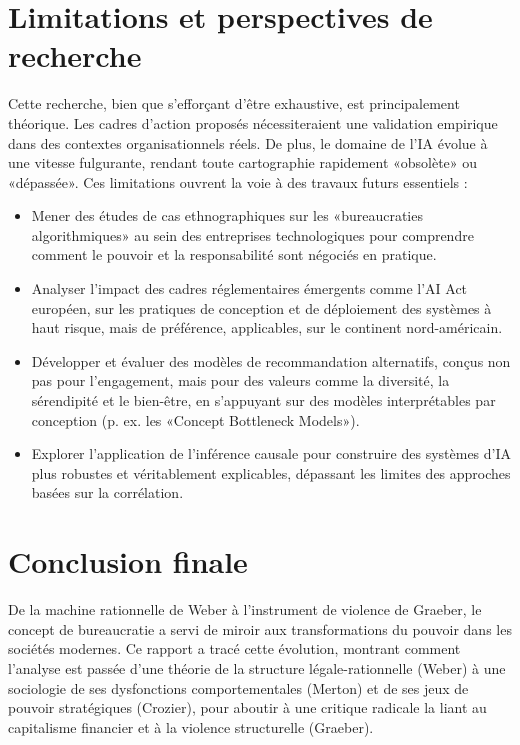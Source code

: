 \section{Limitations et perspectives de recherche}
Cette recherche, bien que s'efforçant d'être exhaustive, est principalement théorique. Les cadres d'action proposés nécessiteraient une validation empirique dans des contextes organisationnels réels. De plus, le domaine de l'IA évolue à une vitesse fulgurante, rendant toute cartographie rapidement «obsolète» ou «dépassée».
Ces limitations ouvrent la voie à des travaux futurs essentiels :
\begin{itemize}[label=\textbullet]
    \item Mener des études de cas ethnographiques sur les «bureaucraties algorithmiques» au sein des entreprises technologiques pour comprendre comment le pouvoir et la responsabilité sont négociés en pratique.
    \item Analyser l'impact des cadres réglementaires émergents comme l'AI Act européen, sur les pratiques de conception et de déploiement des systèmes à haut risque, mais de préférence, applicables, sur le continent nord-américain.
    \item Développer et évaluer des modèles de recommandation alternatifs, conçus non pas pour l'engagement, mais pour des valeurs comme la diversité, la sérendipité et le bien-être, en s'appuyant sur des modèles interprétables par conception (p. ex. les «Concept Bottleneck Models»).
    \item Explorer l'application de l'inférence causale pour construire des systèmes d'IA plus robustes et véritablement explicables, dépassant les limites des approches basées sur la corrélation.
\end{itemize}

\section{Conclusion finale}

De la machine rationnelle de Weber à l'instrument de violence de Graeber, le concept de bureaucratie a servi de miroir aux transformations du pouvoir dans les sociétés modernes. Ce rapport a tracé cette évolution, montrant comment l'analyse est passée d'une théorie de la structure légale-rationnelle (Weber) à une sociologie de ses dysfonctions comportementales (Merton) et de ses jeux de pouvoir stratégiques (Crozier), pour aboutir à une critique radicale la liant au capitalisme financier et à la violence structurelle (Graeber). 

